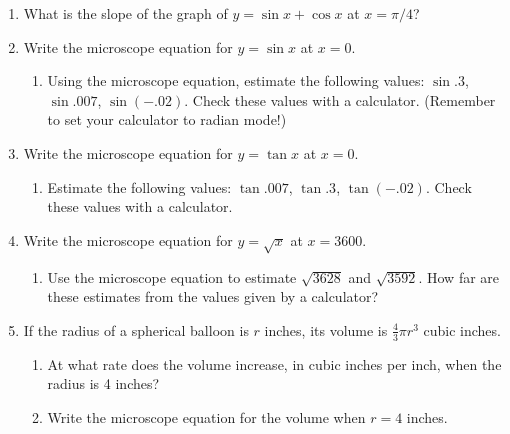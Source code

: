 \begin{enumerate}
  \begin{enumerate}
  \item Where is the lowest point on that graph?  Give the value of the
$x$-coordinate {\em exactly}.  [Answer: $x = \sqrt{5/2}$.]


\end{enumerate}
\item What is the slope of the graph of $y = \sin{x} + \cos{x}$ at $x =
\pi/4$?



\item Write the microscope equation for $y
= \sin{x}$ at $x = 0$.

  \begin{enumerate}
  \item Using the microscope equation, estimate the following values:
$\sin{.3}$, $\sin{.007}$, $\sin(-.02)$.  Check these values with a
calculator. (Remember to set your calculator to radian mode!)


\end{enumerate}
\item Write the microscope equation for $y = \tan{x}$ at $x = 0$.

  \begin{enumerate}
  \item Estimate the following values: $\tan{.007}$, $\tan{.3}$,
$\tan(-.02)$.  Check these values with a calculator.



\end{enumerate}
\item Write the microscope equation for $y = \sqrt{x}$ at $x = 3600$.

  \begin{enumerate}
  \item Use the microscope equation to estimate $\sqrt{3628}$ and
$\sqrt{3592}$.  How far are these estimates from the values given by a
calculator?


\end{enumerate}
\item If the radius of a spherical balloon is $r$ inches, its volume is
$\tfrac{4}{3}\pi r^3$ cubic inches.

  \begin{enumerate}
  \item At what rate does the volume increase, in cubic inches per inch,
when the radius is 4 inches?

  \item Write the microscope equation for the volume when $r = 4$ inches.


\end{enumerate}
\end{enumerate}
